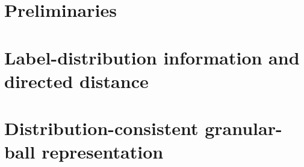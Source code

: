 \documentclass[preprint,12pt]{elsarticle}
\numberwithin{equation}{section}
\begin{document}
\section{Preliminaries}

\section{Label-distribution information and directed distance}

\section{Distribution-consistent granular-ball representation}




\clearpage



\end{document}
